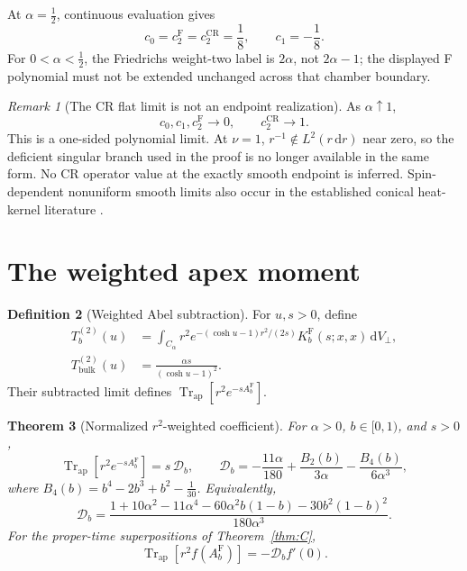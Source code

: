 \documentclass[11pt,a4paper]{article}
\newcommand{\dd}{\mathrm d}
\newcommand{\Fr}{\mathrm F}
\newcommand{\CR}{\mathrm{CR}}
\newcommand{\ApTr}{\operatorname{Tr}_{\mathrm{ap}}}
\newcommand{\Dcal}{\mathcal D}
\theoremstyle{plain}
\newtheorem{theorem}{Theorem}[section]
\theoremstyle{definition}
\newtheorem{definition}[theorem]{Definition}
\theoremstyle{remark}
\newtheorem{remark}[theorem]{Remark}
\numberwithin{equation}{section}
\begin{document}
At \(\alpha=\tfrac12\), continuous evaluation gives
\[
 c_0=c_2^\Fr=c_2^\CR=\frac18,\qquad c_1=-\frac18.
\]
For \(0<\alpha<\tfrac12\), the Friedrichs weight-two label is
\(2\alpha\), not \(2\alpha-1\); the displayed F polynomial must
not be extended unchanged across that chamber boundary.

\begin{remark}[The CR flat limit is not an endpoint realization]
\label{rem:flat}
As \(\alpha\uparrow1\),
\[
 c_0,c_1,c_2^\Fr\longrightarrow0,\qquad c_2^\CR\longrightarrow1.
\]
This is a one-sided polynomial limit. At \(\nu=1\),
\(r^{-1}\notin L^2(r\,\dd r)\) near zero, so the deficient
singular branch used in the proof is no longer available in
the same form. No CR operator value at the exactly smooth
endpoint is inferred. Spin-dependent nonuniform smooth limits
also occur in the established conical heat-kernel literature
\cite{FursaevMiele}.
\end{remark}

\section{The weighted apex moment}
\label{sec:weighted}

\begin{definition}[Weighted Abel subtraction]
For \(u,s>0\), define
\begin{align*}
 T_b^{(2)}(u)
 &=\int_{C_\alpha}r^2
 e^{-(\cosh u-1)r^2/(2s)}
 K_b^\Fr(s;x,x)\,\dd V_\perp,\\
 T_{\mathrm{bulk}}^{(2)}(u)
 &=\frac{\alpha s}{(\cosh u-1)^2}.
\end{align*}
Their subtracted limit defines
\(\ApTr[r^2e^{-sA_b^\Fr}]\).
\end{definition}

\begin{theorem}[Normalized \(r^2\)-weighted coefficient]
\label{thm:D}
For \(\alpha>0\), \(b\in[0,1)\), and \(s>0\),
\begin{equation}
 \ApTr[r^2e^{-sA_b^\Fr}]=s\,\Dcal_b,
 \qquad
 \Dcal_b=
 -\frac{11\alpha}{180}
 +\frac{B_2(b)}{3\alpha}
 -\frac{B_4(b)}{6\alpha^3},
 \label{eq:D}
\end{equation}
where
\(B_4(b)=b^4-2b^3+b^2-\tfrac1{30}\).
Equivalently,
\begin{equation}
 \Dcal_b=
 \frac{1+10\alpha^2-11\alpha^4
       -60\alpha^2b(1-b)-30b^2(1-b)^2}
      {180\alpha^3}.
 \label{eq:Dexpanded}
\end{equation}
For the proper-time superpositions of
Theorem~\ref{thm:C},
\begin{equation}
 \ApTr[r^2f(A_b^\Fr)]=-\Dcal_b f'(0).
 \label{eq:Dfunctional}
\end{equation}
\end{theorem}
\end{document}
